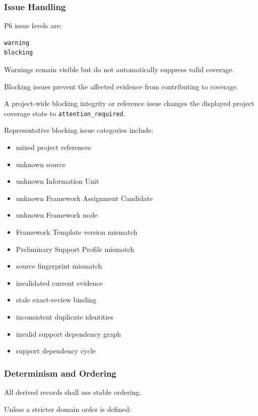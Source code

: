 \hypertarget{issue-handling}{%
\subsubsection{Issue Handling}\label{issue-handling}}

P6 issue levels are:

\begin{verbatim}
warning
blocking
\end{verbatim}

Warnings remain visible but do not automatically suppress valid coverage.

Blocking issues prevent the affected evidence from contributing to coverage.

A project-wide blocking integrity or reference issue changes the displayed project coverage state to \texttt{attention\_required}.

Representative blocking issue categories include:

\begin{itemize}
\tightlist
\item
  mixed project references
\item
  unknown source
\item
  unknown Information Unit
\item
  unknown Framework Assignment Candidate
\item
  unknown Framework node
\item
  Framework Template version mismatch
\item
  Preliminary Support Profile mismatch
\item
  source fingerprint mismatch
\item
  invalidated current evidence
\item
  stale exact-review binding
\item
  inconsistent duplicate identities
\item
  invalid support dependency graph
\item
  support dependency cycle
\end{itemize}

\hypertarget{determinism-and-ordering}{%
\subsubsection{Determinism and Ordering}\label{determinism-and-ordering}}

All derived records shall use stable ordering.

Unless a stricter domain order is defined:

